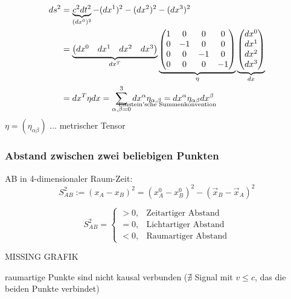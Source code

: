 \documentclass[a4paper, 11pt]{article}
\numberwithin{equation}{section}
\begin{document}
\begin{equation}
\begin{aligned}
ds^2 &= \underbrace{c^2dt^2}_{(dx^0)^2} - (dx^1)^2 - (dx^2)^2 - (dx^3)^2 \\
&= \underbrace{\begin{pmatrix} dx^0 & dx^1 & dx^2 & dx^3 \end{pmatrix}}_{dx^T} \underbrace{\begin{pmatrix}
1 & 0 & 0 &0\\ 0 & -1 & 0 & 0 \\ 0 & 0 & -1 & 0 \\ 0& 0 & 0 & -1\end{pmatrix}}_{\eta} \underbrace{\begin{pmatrix} dx^0 \\ dx^1 \\ dx^2 \\dx^3 \end{pmatrix}}_{dx} \\
&= dx^T\eta dx = \sum^3_{\alpha,\beta = 0} dx^\alpha \eta_{\alpha, \beta} \underset{\mathclap{\text{Einstein'sche Summenkonvention}}}{=} dx^\alpha \eta_{\alpha \beta} dx^\beta
\end{aligned}
\end{equation}
$\eta = (\eta_{\alpha \beta})$ ... metrischer Tensor


\subsubsection*{Abstand zwischen zwei beliebigen Punkten}
AB in 4-dimensionaler Raum-Zeit:
\begin{equation}\label{glg:1_abstand4DimRaumZeit}
S^2_{AB} := (x_A- x_B)^2 = \left(x^0_A -x^0_B\right)^2 - \left(\vec{x}_B - \vec{x}_A\right)^2
\end{equation}

\begin{equation}
S^2_{AB} = \begin{cases}
>0, & \text{Zeitartiger Abstand} \\
=0, & \text{Lichtartiger Abstand} \\
<0, & \text{Raumartiger Abstand}
\end{cases}
\end{equation}

MISSING GRAFIK

raumartige Punkte sind nicht kausal verbunden ($\nexists$ Signal mit $v \leq c$, das die beiden Punkte verbindet) 
\end{document}
